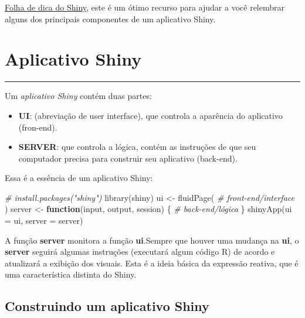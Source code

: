 \documentclass[
]{book}
\newenvironment{Shaded}{\begin{snugshade}}{\end{snugshade}}
\newcommand{\AttributeTok}[1]{\textcolor[rgb]{0.77,0.63,0.00}{#1}}
\newcommand{\CommentTok}[1]{\textcolor[rgb]{0.56,0.35,0.01}{\textit{#1}}}
\newcommand{\ControlFlowTok}[1]{\textcolor[rgb]{0.13,0.29,0.53}{\textbf{#1}}}
\newcommand{\FunctionTok}[1]{\textcolor[rgb]{0.00,0.00,0.00}{#1}}
\newcommand{\NormalTok}[1]{#1}
\newcommand{\OtherTok}[1]{\textcolor[rgb]{0.56,0.35,0.01}{#1}}
\begin{document}
\href{https://www.rstudio.com/wp-content/uploads/2015/02/shiny-cheatsheet.pdf}{Folha de dica do Shiny}, este é um ótimo recurso para ajudar a você relembrar alguns dos principais componentes de um aplicativo Shiny.

\hypertarget{aplicativo-shiny}{%
\chapter{\texorpdfstring{\textbf{Aplicativo Shiny}}{Aplicativo Shiny}}\label{aplicativo-shiny}}

\begin{center}\rule{0.5\linewidth}{0.5pt}\end{center}

Um \emph{aplicativo Shiny} contém duas partes:

\begin{itemize}
\item
  \textbf{UI}: (abreviação de user interface), que controla a aparência do aplicativo (fron-end).
\item
  \textbf{SERVER}: que controla a lógica, contém as instruções de que seu computador precisa para construir seu aplicativo (back-end).
\end{itemize}

Essa é a essência de um aplicativo Shiny:

\begin{Shaded}
\begin{Highlighting}[]
\CommentTok{\# install.packages("shiny")}
\FunctionTok{library}\NormalTok{(shiny)}
\NormalTok{ui }\OtherTok{\textless{}{-}} \FunctionTok{fluidPage}\NormalTok{(}
  \CommentTok{\# front{-}end/interface}
\NormalTok{)}
\NormalTok{server }\OtherTok{\textless{}{-}} \ControlFlowTok{function}\NormalTok{(input, output, session) \{}
  \CommentTok{\# back{-}end/lógica}
\NormalTok{\}}
\FunctionTok{shinyApp}\NormalTok{(}\AttributeTok{ui =}\NormalTok{ ui, }\AttributeTok{server =}\NormalTok{ server)}
\end{Highlighting}
\end{Shaded}

A função \textbf{server} monitora a função \textbf{ui}.Sempre que houver uma mudança na \textbf{ui}, o \textbf{server} seguirá algumas instruções (executará algum código R) de acordo e atualizará a exibição dos visuais. Esta é a ideia básica da expressão reativa, que é uma característica distinta do Shiny.

\hypertarget{construindo-um-aplicativo-shiny}{%
\section{\texorpdfstring{\textbf{Construindo um aplicativo Shiny}}{Construindo um aplicativo Shiny}}\label{construindo-um-aplicativo-shiny}}
\end{document}
